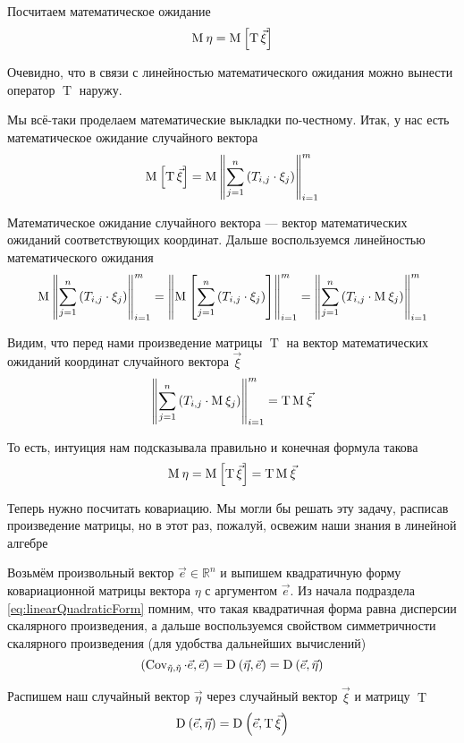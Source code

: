 Посчитаем математическое ожидание
$$\operatorname{M}_{} \eta = \operatorname{M}_{} \left[ \operatorname{T} \vec{\xi}  \right]$$

Очевидно, что в связи с линейностью математического ожидания можно вынести
оператор $\operatorname{T}$ наружу.

Мы всё-таки проделаем математические выкладки по-честному.
Итак, у нас есть математическое ожидание случайного вектора
$$\operatorname{M}_{} \left[ \operatorname{T} \vec{\xi}  \right]
    = \operatorname{M}_{} \left\| \sum_{j=1}^n \left( T_{i,j} \cdot \xi_j \right)
        \right\|_{i=1}^m$$

Математическое ожидание случайного вектора --- вектор математических ожиданий
соответствующих координат.
Дальше воспользуемся линейностью математического ожидания
$$\operatorname{M}_{} \left\| \sum_{j=1}^n \left( T_{i,j} \cdot \xi_j \right)
        \right\|_{i=1}^m
    = \left\| \operatorname{M}_{} \left[ \sum_{j=1}^n \left( T_{i,j} \cdot \xi_j \right) \right]
        \right\|_{i=1}^m
    = \left\| \sum_{j=1}^n \left( T_{i,j} \cdot \operatorname{M}_{} \xi_j \right)
        \right\|_{i=1}^m$$

Видим, что перед нами произведение матрицы $\operatorname{T}$ на вектор
математических ожиданий координат случайного вектора $\vec{\xi}$
$$\left\| \sum_{j=1}^n \left( T_{i,j} \cdot \operatorname{M}_{} \xi_j \right)
    \right\|_{i=1}^m = \operatorname{T} \operatorname{M}_{} \vec{\xi} $$

То есть, интуиция нам подсказывала правильно и конечная формула такова
$$\operatorname{M}_{} \eta
    = \operatorname{M}_{} \left[ \operatorname{T} \vec{\xi}  \right]
    = \operatorname{T} \operatorname{M}_{} \vec{\xi} $$

Теперь нужно посчитать ковариацию. Мы могли бы решать эту задачу,
расписав произведение матрицы, но в этот раз, пожалуй, освежим наши знания
в линейной алгебре

Возьмём произвольный вектор $\vec{e} \in \mathbb{R}^n$
и выпишем квадратичную форму ковариационной матрицы вектора $\eta$
с аргументом $\vec{e}$. Из начала подраздела \eqref{eq:linearQuadraticForm}
помним, что такая квадратичная форма равна дисперсии скалярного произведения, а
дальше воспользуемся свойством симметричности скалярного произведения
(для удобства дальнейших вычислений)
$$\left( \operatorname{Cov_{\vec{\eta}, \vec{\eta}}} \cdot \vec{e}, \vec{e} \right)
    = \operatorname{D}_{} \left( \vec{\eta}, \vec{e} \right)
    = \operatorname{D}_{} \left( \vec{e}, \vec{\eta} \right)$$

Распишем наш случайный вектор $\vec{\eta}$ через случайный вектор $\vec{\xi}$
и матрицу $\operatorname{T}$
$$\operatorname{D}_{} \left( \vec{e}, \vec{\eta} \right)
    = \operatorname{D}_{} \left( \vec{e}, \operatorname{T} \vec{\xi} \right)$$

